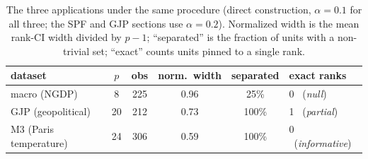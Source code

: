 \begin{table}[htb]
  \centering
  \caption[The three regimes]{The three applications under the same procedure (direct
  construction, $\alpha=0.1$ for all three; the SPF and GJP sections use $\alpha=0.2$).
  Normalized width is the mean rank-CI width divided by $p-1$; ``separated'' is the
  fraction of units with a non-trivial set; ``exact'' counts units pinned to a single
  rank.}
  \label{tab:threeregimes}
  \small
  \begin{tabular}{lccccl}
    \toprule
    dataset & $p$ & obs & norm.\ width & separated & exact ranks\\
    \midrule
    macro (NGDP)           & 8 & 225 & 0.96 & 25\% & 0 \ (\emph{null})\\
    GJP (geopolitical)     & 20 & 212 & 0.73 & 100\% & 1 \ (\emph{partial})\\
    M3 (Paris temperature) & 24 & 306 & 0.59 & 100\% & 0 \ (\emph{informative})\\
    \bottomrule
  \end{tabular}
\end{table}
